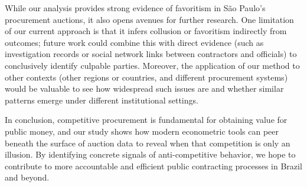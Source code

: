 While our analysis provides strong evidence of favoritism in São Paulo’s procurement auctions, it also opens avenues for further research. One limitation of our current approach is that it infers collusion or favoritism indirectly from outcomes; future work could combine this with direct evidence (such as investigation records or social network links between contractors and officials) to conclusively identify culpable parties. Moreover, the application of our method to other contexts (other regions or countries, and different procurement systems) would be valuable to see how widespread such issues are and whether similar patterns emerge under different institutional settings. 

In conclusion, competitive procurement is fundamental for obtaining value for public money, and our study shows how modern econometric tools can peer beneath the surface of auction data to reveal when that competition is only an illusion. By identifying concrete signals of anti-competitive behavior, we hope to contribute to more accountable and efficient public contracting processes in Brazil and beyond.
